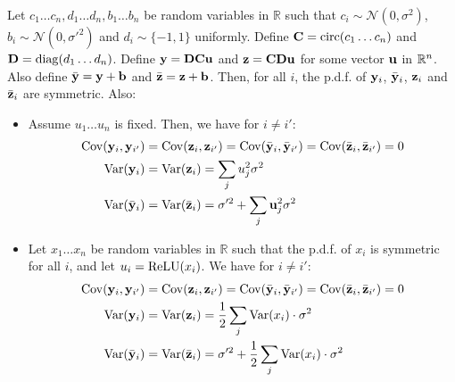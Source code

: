 \begin{lemma}
Let $c_{1} \ldots c_{n}, d_{1} \ldots d_{n}, b_{1} \ldots b_{n}$ be random variables in $\mathbb{R}$ such that $c_{i}\sim\mathcal{N}(0,\sigma^{2})$, $b_{i}\sim\mathcal{N}(0,\sigma'^{2})$ and $d_{i}\sim\{-1,1\}$ uniformly.
Define $\mathbf{C} = \mathrm{circ}(c_{1} \ldots c_{n})$ and $\mathbf{D} = \mathrm{diag} (d_{1} \ldots d_{n})$.
Define $\mathbf{y} = \mathbf{D} \mathbf{C} \mathbf{u}$ and $\mathbf{z} = \mathbf{C} \mathbf{D} \mathbf{u}$ for some vector $\mathbf{u}$ in ${\mathbb{R}}^{n}$.
Also define $\bar{\mathbf{y}} = \mathbf{y} + \mathbf{b}$ and $\bar{\mathbf{z}} = \mathbf{z} + \mathbf{b}$.
Then, for all $i$, the p.d.f. of $\mathbf{y}_{i}$, $\bar{\mathbf{y}}_{i}$, $\mathbf{z}_{i}$ and $\bar{\mathbf{z}}_{i}$ are symmetric.
Also:
\begin{itemize}
  \item Assume $u_1 \ldots u_n$ is fixed. Then, we have for $i \neq i'$:
  \begin{align*}
    \mathrm{Cov}(\mathbf{y}_i, \mathbf{y}_{i'}) & = \mathrm{Cov}(\mathbf{z}_i, \mathbf{z}_{i'}) = \mathrm{Cov}(\bar{\mathbf{y}}_i, \bar{\mathbf{y}}_{i'}) = \mathrm{Cov}(\bar{\mathbf{z}}_i,\bar{\mathbf{z}}_{i'}) = 0 \\
    \mathrm{Var}(\mathbf{y}_i) &= \mathrm{Var}(\mathbf{z}_{i}) = \sum_{j} u_{j}^{2}\sigma^{2} \\
    \mathrm{Var}(\bar{\mathbf{y}}_{i}) & = \mathrm{Var}(\bar{\mathbf{z}}_{i}) = \sigma'^2 + \sum_{j} \mathbf{u}_{j}^{2} \sigma^{2}
  \end{align*}
  \item Let $x_{1}\ldots x_{n}$ be random variables in $\mathbb{R}$ such that the p.d.f. of $x_{i}$ is symmetric for all $i$, and let $u_{i} = \operatorname{ReLU}(x_{i})$.
    We have for $i\neq i':$
  \begin{align*}
    \mathrm{Cov}(\mathbf{y}_i, \mathbf{y}_{i'}) & = \mathrm{Cov}(\mathbf{z}_{i}, \mathbf{z}_{i'}) = \mathrm{Cov}(\bar{\mathbf{y}}_{i}, \bar{\mathbf{y}}_{i'}) = \mathrm{Cov}(\bar{\mathbf{z}}_i, \bar{\mathbf{z}}_{i'})= 0 \\ 
    \mathrm{Var}(\mathbf{y}_i) & = \mathrm{Var}(\mathbf{z}_i) = \frac{1}{2} \sum_j \mathrm{Var}(x_i) \cdot \sigma^2 \\
    \mathrm{Var}(\bar{\mathbf{y}}_{i}) &= \mathrm{Var}(\bar{\mathbf{z}}_{i}) = \sigma'^2 + \frac{1}{2} \sum_{j} \mathrm{Var}(x_{i}) \cdot \sigma^2
  \end{align*}
\end{itemize}
\label{lemma:covariance}
\end{lemma}
